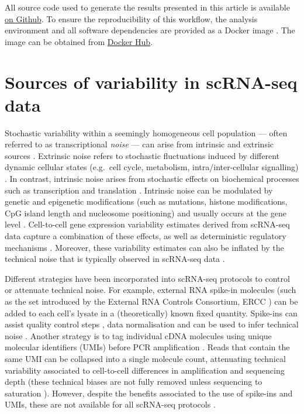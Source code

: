 \documentclass[9pt,a4paper,]{extarticle}
\begin{document}
All source code used to generate the results presented in this article is
available \href{https://github.com/VallejosGroup/BASiCSWorkflow}{on Github}.
To ensure the
reproducibility of this workflow, the analysis environment and all software
dependencies are provided as a Docker image \citep{Boettiger2015}. The image
can be obtained from
\href{https://hub.docker.com/repository/docker/alanocallaghan/bocker}{Docker Hub}.

\hypertarget{sources-of-variability-in-scrna-seq-data}{%
\section{Sources of variability in scRNA-seq data}\label{sources-of-variability-in-scrna-seq-data}}

Stochastic variability within a seemingly homogeneous cell population --- often
referred to as transcriptional \emph{noise} --- can arise from intrinsic and
extrinsic sources \citep{Elowitz2002, Eling2019}.
Extrinsic noise refers to stochastic fluctuations induced by
different dynamic cellular states (e.g.~cell cycle, metabolism,
intra/inter-cellular signalling) \citep{Zopf2013, Iwamoto2016, Kiviet2014}.
In contrast, intrinsic noise arises from stochastic effects on biochemical
processes such as transcription and translation \citep{Elowitz2002}.
Intrinsic noise can be modulated by genetic and epigenetic modifications (such
as mutations, histone modifications, CpG island length and nucleosome
positioning) \citep{Eberwine2015, Faure2017, Morgan2018} and usually occurs
at the gene level \citep{Elowitz2002}.
Cell-to-cell gene expression variability estimates derived from scRNA-seq data
capture a combination of these effects, as well as deterministic regulatory
mechanisms \citep{Eling2019}.
Moreover, these variability estimates can also be inflated by the technical
noise that is typically observed in scRNA-seq data \citep{Brennecke2013}.

Different strategies have been incorporated into scRNA-seq protocols to control
or attenuate technical noise.
For example, external RNA spike-in molecules (such as the set introduced by the
External RNA Controls Consortium, ERCC \citep{Rna2005}) can be added to each cell's
lysate in a (theoretically) known fixed quantity.
Spike-ins can assist quality control steps \citep{McCarthy2017}, data normalisation
\citep{Vallejos2017} and can be used to infer technical noise \citep{Brennecke2013}.
Another strategy is to tag individual cDNA molecules using unique molecular
identifiers (UMIs) before PCR amplification \citep{Islam2014}.
Reads that contain the same UMI can be collapsed into a single molecule count,
attenuating technical variability associated to cell-to-cell differences
in amplification and sequencing depth (these technical biases are not fully
removed unless sequencing to saturation \citep{Vallejos2017}).
However, despite the benefits associated to the use of spike-ins and UMIs,
these are not available for all scRNA-seq protocols \citep{Haque2017}.
\end{document}
